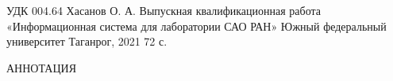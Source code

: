 \begin{flushright}
УДК 004.64
Хасанов О. А.
Выпускная квалификационная работа
«Информационная система для лаборатории САО РАН»
Южный федеральный университет
Таганрог, 2021
72 с.
\end{flushright}
\begin{center}
 АННОТАЦИЯ
\end{center}
